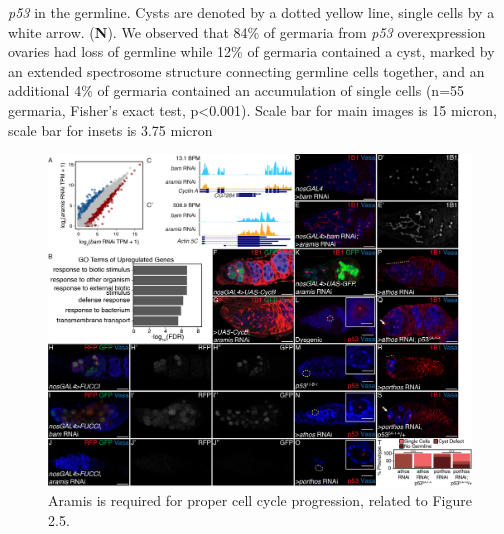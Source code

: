 \documentclass[12pt,oneside]{reedthesis}
\begin{document}
\emph{p53} in the germline. Cysts are denoted by a dotted yellow line, single
cells by a white arrow. (\textbf{N}). We observed that 84\% of germaria from
\emph{p53} overexpression ovaries had loss of germline while 12\% of germaria
contained a cyst, marked by an extended spectrosome structure connecting
germline cells together, and an additional 4\% of germaria contained an
accumulation of single cells (n=55 germaria, Fisher's exact test,
p\textless0.001). Scale bar for main images is 15 micron, scale bar for insets
is 3.75 micron
\begin{figure}

{\centering \includegraphics[width=7 in,height=5.409091 in]{./figure/Ribosome Biogenesis/Ribosome Biogenesis 3S} 

}

\caption[Aramis is required for proper cell cycle progression, related to Figure 2.5.]{Aramis is required for proper cell cycle progression, related to Figure 2.5.}\label{fig:unnamed-chunk-11}
\end{figure}
\textbf{\hfill\break
}
\end{document}
